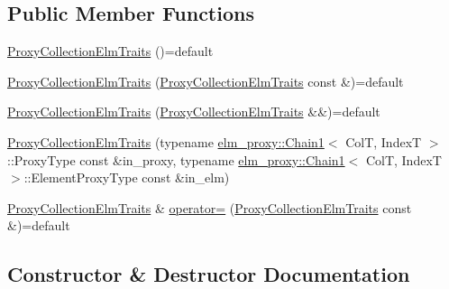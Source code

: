 \subsection*{Public Member Functions}
\begin{DoxyCompactItemize}
\item 
\hyperlink{structvt_1_1vrt_1_1collection_1_1_proxy_collection_elm_traits_a99989c5f3f73a85a8aaac9e66f02c092}{Proxy\+Collection\+Elm\+Traits} ()=default
\item 
\hyperlink{structvt_1_1vrt_1_1collection_1_1_proxy_collection_elm_traits_af40e58d7124ed1c6291e971fb7bf7526}{Proxy\+Collection\+Elm\+Traits} (\hyperlink{structvt_1_1vrt_1_1collection_1_1_proxy_collection_elm_traits}{Proxy\+Collection\+Elm\+Traits} const \&)=default
\item 
\hyperlink{structvt_1_1vrt_1_1collection_1_1_proxy_collection_elm_traits_a6aa57d5aaf1c68086bc764118d11c11e}{Proxy\+Collection\+Elm\+Traits} (\hyperlink{structvt_1_1vrt_1_1collection_1_1_proxy_collection_elm_traits}{Proxy\+Collection\+Elm\+Traits} \&\&)=default
\item 
\hyperlink{structvt_1_1vrt_1_1collection_1_1_proxy_collection_elm_traits_a3570066e1112f7e7f860d152137f4470}{Proxy\+Collection\+Elm\+Traits} (typename \hyperlink{namespacevt_1_1vrt_1_1collection_1_1elm__proxy_af1c695e3f939aca249111179a57b24bf}{elm\+\_\+proxy\+::\+Chain1}$<$ ColT, IndexT $>$\+::Proxy\+Type const \&in\+\_\+proxy, typename \hyperlink{namespacevt_1_1vrt_1_1collection_1_1elm__proxy_af1c695e3f939aca249111179a57b24bf}{elm\+\_\+proxy\+::\+Chain1}$<$ ColT, IndexT $>$\+::Element\+Proxy\+Type const \&in\+\_\+elm)
\item 
\hyperlink{structvt_1_1vrt_1_1collection_1_1_proxy_collection_elm_traits}{Proxy\+Collection\+Elm\+Traits} \& \hyperlink{structvt_1_1vrt_1_1collection_1_1_proxy_collection_elm_traits_a9a731128f131124782a61937aa8e0f5e}{operator=} (\hyperlink{structvt_1_1vrt_1_1collection_1_1_proxy_collection_elm_traits}{Proxy\+Collection\+Elm\+Traits} const \&)=default
\end{DoxyCompactItemize}


\subsection{Constructor \& Destructor Documentation}
\mbox{\label{structvt_1_1vrt_1_1collection_1_1_proxy_collection_elm_traits_a99989c5f3f73a85a8aaac9e66f02c092}} 
